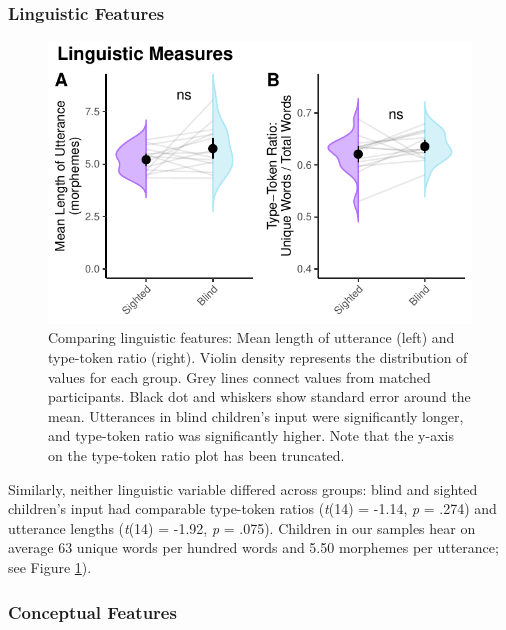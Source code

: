 \documentclass[
  man]{apa6}
\begin{document}
\hypertarget{linguistic-features-1}{%
\subsubsection{Linguistic Features}\label{linguistic-features-1}}

\begin{figure}
\centering
\includegraphics{input_quality_manuscript_files/figure-latex/linguistic-plots-1.pdf}
\caption{\label{fig:linguistic-plots}Comparing linguistic features: Mean length of utterance (left) and type-token ratio (right). Violin density represents the distribution of values for each group. Grey lines connect values from matched participants. Black dot and whiskers show standard error around the mean. Utterances in blind children's input were significantly longer, and type-token ratio was significantly higher. Note that the y-axis on the type-token ratio plot has been truncated.}
\end{figure}

Similarly, neither linguistic variable differed across groups: blind and sighted children's input had comparable type-token ratios (\emph{t}(14) = -1.14, \emph{p} = .274) and utterance lengths (\emph{t}(14) = -1.92, \emph{p} = .075). Children in our samples hear on average 63 unique words per hundred words and 5.50 morphemes per utterance; see Figure \ref{fig:linguistic-plots}).

\hypertarget{conceptual-features-1}{%
\subsubsection{Conceptual Features}\label{conceptual-features-1}}
\end{document}
